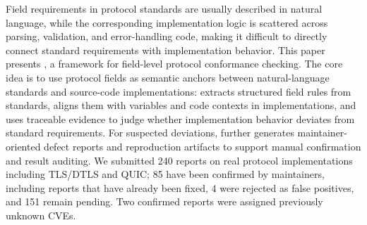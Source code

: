 Field requirements in protocol standards are usually described in natural
language, while the corresponding implementation logic is scattered across
parsing, validation, and error-handling code, making it difficult to directly
connect standard requirements with implementation behavior. This paper presents
\tool{}, a framework for field-level protocol conformance checking. The core
idea is to use protocol fields as semantic anchors between natural-language
standards and source-code implementations: \tool{} extracts structured field
rules from standards, aligns them with variables and code contexts in
implementations, and uses traceable evidence to judge whether implementation
behavior deviates from standard requirements. For suspected deviations,
\tool{} further generates maintainer-oriented defect reports and reproduction
artifacts to support manual confirmation and result auditing. We
submitted 240 reports on real protocol implementations including TLS/DTLS and
QUIC; 85 have been confirmed by maintainers, including reports that have already
been fixed, 4 were rejected as false positives, and 151 remain pending. Two
confirmed reports were assigned previously unknown CVEs.
